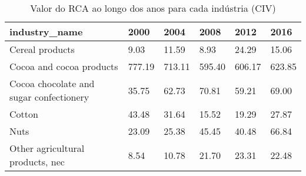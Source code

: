 \begin{table}
\centering
\caption{Valor do RCA ao longo dos anos para cada indústria (CIV)}
\begin{tabular}{p{6cm}p{1.5cm}p{1.5cm}p{1.5cm}p{1.5cm}p{1.5cm}}
\toprule
                          industry\_name &   2000 &   2004 &   2008 &   2012 &   2016 \\
\midrule
                        Cereal products &   9.03 &  11.59 &   8.93 &  24.29 &  15.06 \\
               Cocoa and cocoa products & 777.19 & 713.11 & 595.40 & 606.17 & 623.85 \\
Cocoa chocolate and sugar confectionery &  35.75 &  62.73 &  70.81 &  59.21 &  69.00 \\
                                 Cotton &  43.48 &  31.64 &  15.52 &  19.29 &  27.87 \\
                                   Nuts &  23.09 &  25.38 &  45.45 &  40.48 &  66.84 \\
       Other agricultural products, nec &   8.54 &  10.78 &  21.70 &  23.31 &  22.48 \\
\bottomrule
\end{tabular}
\end{table}

